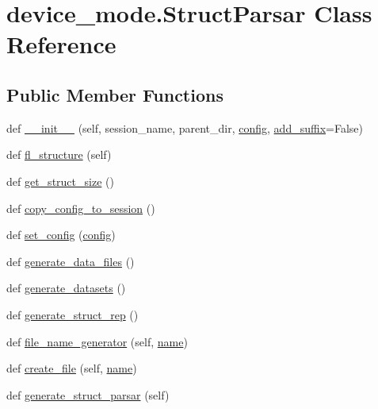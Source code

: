 \hypertarget{classdevice__mode_1_1StructParsar}{}\section{device\+\_\+mode.\+Struct\+Parsar Class Reference}
\label{classdevice__mode_1_1StructParsar}
\subsection*{Public Member Functions}
\begin{DoxyCompactItemize}
\item 
def \hyperlink{classdevice__mode_1_1StructParsar_a3fd85c5d99b5bfc1e359d9457cc07df1}{\+\_\+\+\_\+init\+\_\+\+\_\+} (self, session\+\_\+name, parent\+\_\+dir, \hyperlink{classdevice__mode_1_1StructParsar_a54cc58295d8352d412afb79f32f1ac06}{config}, \hyperlink{classdevice__mode_1_1StructParsar_a0f1adb7dde59a293a12a4889e9b3880b}{add\+\_\+suffix}=False)
\item 
def \hyperlink{classdevice__mode_1_1StructParsar_a27f6ebed8dceb8e44d29294383288ea3}{fl\+\_\+structure} (self)
\item 
def \hyperlink{classdevice__mode_1_1StructParsar_ad08ea57819388138c2e94a43780b6da5}{get\+\_\+struct\+\_\+size} ()
\item 
def \hyperlink{classdevice__mode_1_1StructParsar_aa712e82c9d517f5dc900a2160087b544}{copy\+\_\+config\+\_\+to\+\_\+session} ()
\item 
def \hyperlink{classdevice__mode_1_1StructParsar_a4cdbf854c368e74051b505cca98ec41e}{set\+\_\+config} (\hyperlink{classdevice__mode_1_1StructParsar_a54cc58295d8352d412afb79f32f1ac06}{config})
\item 
def \hyperlink{classdevice__mode_1_1StructParsar_ae57ed24c72707985427085a6ba87087c}{generate\+\_\+data\+\_\+files} ()
\item 
def \hyperlink{classdevice__mode_1_1StructParsar_aa61ace2e8ff58899b980e083c442bd7c}{generate\+\_\+datasets} ()
\item 
def \hyperlink{classdevice__mode_1_1StructParsar_a0292edb37b72eb19e711d58f6fc2567f}{generate\+\_\+struct\+\_\+rep} ()
\item 
def \hyperlink{classdevice__mode_1_1StructParsar_a41a89941190ffef686890ed45110a086}{file\+\_\+name\+\_\+generator} (self, \hyperlink{classdevice__mode_1_1StructParsar_a937fe4559444433d8cff05910c16a4b6}{name})
\item 
def \hyperlink{classdevice__mode_1_1StructParsar_a87d7fedb8e4d87378eab71acc68dfb43}{create\+\_\+file} (self, \hyperlink{classdevice__mode_1_1StructParsar_a937fe4559444433d8cff05910c16a4b6}{name})
\item 
def \hyperlink{classdevice__mode_1_1StructParsar_afe15c55fc572e5fa0f02bf03188de789}{generate\+\_\+struct\+\_\+parsar} (self)
\end{DoxyCompactItemize}
